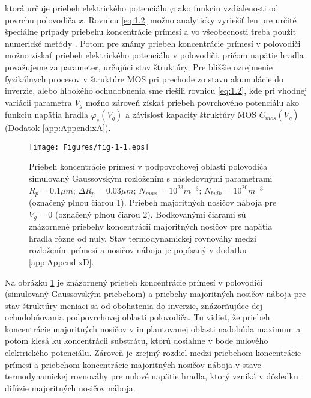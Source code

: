 ktorá určuje priebeh elektrického potenciálu $\varphi$ ako funkciu
vzdialenosti od povrchu polovodiča $x$. Rovnicu \ref{eq:1.2} možno
analyticky vyriešiť len pre určité špeciálne prípady priebehu
koncentrácie prímesí a vo všeobecnosti treba použiť numerické metódy
\cite{1.9,1.10}. Potom pre známy priebeh koncentrácie prímesí v
polovodiči možno získať priebeh elektrického potenciálu v polovodiči,
pričom napätie hradla považujeme za parameter, určujúci stav
štruktúry. Pre bližšie ozrejmenie fyzikálnych procesov v štruktúre MOS
pri prechode zo stavu akumulácie do inverzie, alebo hlbokého
ochudobnenia sme riešili rovnicu \ref{eq:1.2}, kde pri vhodnej
variácii parametra $V_g$ možno zároveň získať priebeh povrchového
potenciálu ako funkciu napätia hradla $\varphi_{s}(V_g)$ a závislosť
kapacity štruktúry MOS $C_{mos}(V_g)$ (Dodatok \ref{app:AppendixA}).

\begin{figure}[h!]\centering
\texttt{[image: Figures/fig-1-1.eps]}
\captionsetup{justification=raggedright, singlelinecheck=false}
\caption[Priebeh koncentrácie prímesí v podpovrchovej oblasti
  polovodiča]{Priebeh koncentrácie prímesí v podpovrchovej oblasti
  polovodiča simulovaný Gaussovským rozložením \cite{1.11} s
  následovnými parametrami $R_p=0.1 \mu{m}$; $\Delta{R_p}=0.03
  \mu{m}$; $N_{max}=10^{23} m^{-3}$; $N_{bulk}=10^{20} m^{-3}$
  (označený plnou čiarou 1). Priebeh majoritných nosičov náboja pre
  $V_g=0$ (označený plnou čiarou 2). Bodkovanými čiarami sú znázornené
  priebehy koncentrácií majoritných nosičov pre napätia hradla rôzne
  od nuly. Stav termodynamickej rovnováhy medzi rozložením prímesí a
  nosičov náboja je popísaný v dodatku \ref{app:AppendixD}.}
\label{fig:1.1}
\end{figure}

\par Na obrázku \ref{fig:1.1} je znázornený priebeh koncentrácie
prímesí v polovodiči (simulovaný Gaussovským priebehom) a priebehy
majoritných nosičov náboja pre stav štruktúry meniaci sa od obohatenia
do inverzie, znázorňujúce dej ochudobňovania podpovrchovej oblasti
polovodiča. Tu vidieť, že priebeh koncentrácie majoritných nosičov v
implantovanej oblasti nadobúda maximum a potom klesá ku koncentrácii
substrátu, ktorú dosiahne v bode nulového elektrického potenciálu.
Zároveň je zrejmý rozdiel medzi priebehom koncentrácie prímesí a
priebehom koncentrácie majoritných nosičov náboja v stave
termodynamickej rovnováhy pre nulové napätie hradla, ktorý vzniká v
dôsledku difúzie majoritných nosičov náboja.

